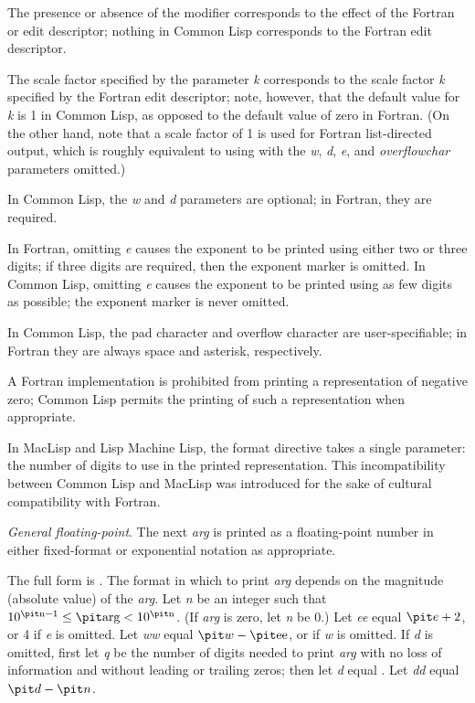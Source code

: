 \begin{flushdesc}
\begin{incompatibility}
The presence
or absence of the \cd{{\Xatsign}} modifier corresponds to the effect of
the Fortran  or  edit descriptor; nothing in Common Lisp
corresponds to the Fortran  edit descriptor.

The scale factor
specified by the parameter {\it k} corresponds to the scale factor {\it k}
specified by the Fortran  edit descriptor;
note, however, that the default value for {\it k} is 1 in Common Lisp,
as opposed to the default value of zero in Fortran.
(On the other hand, note that a scale factor of 1 is used
for Fortran list-directed output, which is roughly
equivalent to using  with the {\it w}, {\it d},
{\it e}, and {\it overflowchar} parameters
omitted.)

In Common Lisp, the {\it w} and {\it d}
parameters are optional; in Fortran, they are required.

In Fortran, omitting {\it e} causes the exponent to be printed using
either two or three digits; if three digits are required, then the
exponent marker is omitted.  In Common Lisp, omitting {\it e} causes the
exponent to be printed using as few digits as possible; the exponent marker
is never omitted.

In Common Lisp, the pad character and overflow character are user-specifiable;
in Fortran they are always space and asterisk, respectively.

A Fortran implementation
is prohibited from printing a representation of negative zero;
Common Lisp permits the printing of such a representation when appropriate.

In MacLisp and Lisp Machine Lisp, the  format directive takes
a single parameter: the number of digits to use in the printed
representation.  This incompatibility between
Common Lisp and MacLisp was introduced for the sake of cultural compatibility
with Fortran.
\end{incompatibility}
\afternoterule

\newpage%

\item[\cd{{\Xtilde}G}]
{\it General floating-point}.  The next {\it arg} is printed as a floating-point
number in either fixed-format or exponential notation as appropriate.

The full form is .
The format in which to print {\it arg} depends on the magnitude (absolute
value) of the {\it arg}.  Let {\it n} be an integer such that
$10^{\hbox{\scriptsize\it n}-1}\leq\hbox{\it arg}<10^{\hbox{\scriptsize\it n}}$.
(If {\it arg} is zero, let {\it n} be 0.)
Let {\it ee} equal ${\it e}+2$, or 4 if {\it e} is omitted.
Let {\it ww} equal ${\it w}-\hbox{\it ee}$,
or {\nil} if {\it w} is omitted.  If {\it d} is omitted, first let {\it q}
be the number of digits needed to print {\it arg} with no loss
of information and without leading or trailing zeros;
then let {\it d} equal .
Let {\it dd} equal ${\it d}-{\it n}$.


\end{flushdesc}
